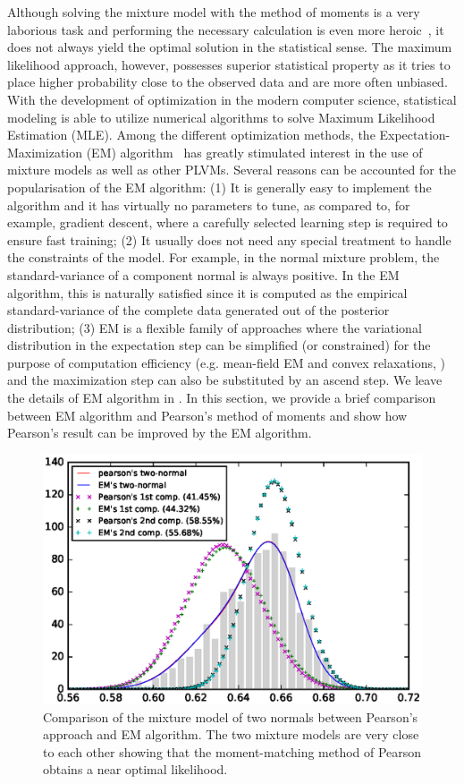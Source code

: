 Although solving the mixture model with the method of moments is a very
laborious task and performing the necessary calculation is even more
heroic~\cite{mclachlan2004finite}, it does not always yield the optimal solution
in the statistical sense. The maximum likelihood approach, however, possesses
superior statistical property as it tries to place higher probability close to
the observed data and are more often unbiased. With the development of
optimization in the modern computer science, statistical modeling is able to
utilize numerical algorithms to solve Maximum Likelihood Estimation (MLE).
Among the different optimization methods, the Expectation-Maximization (EM)
algorithm~\cite{dempster1977maximum} has greatly stimulated interest in the use
of mixture models as well as other PLVMs. Several reasons can be accounted for
the popularisation of the EM algorithm: (1) It is generally easy to implement
the algorithm and it has virtually no parameters to tune, as compared to, for
example, gradient descent, where a carefully selected learning step is required
to ensure fast training; (2) It usually does not need any special treatment to
handle the constraints of the model. For example, in the normal mixture problem,
the standard-variance of a component normal is always positive. In the EM
algorithm, this is naturally satisfied since it is computed as the empirical
standard-variance of the complete data generated out of the posterior
distribution; (3) EM is a flexible family of approaches where the variational
distribution in the expectation step can be simplified (or constrained) for the
purpose of computation efficiency (e.g. mean-field EM and convex relaxations,
\cite[see][Chapter 5, 7]{wainwright2008graphical}) and the maximization step can
also be substituted by an ascend step. We leave the details of EM algorithm in
. In this section, we provide a brief comparison between EM
algorithm and Pearson's method of moments and show how Pearson's result can be
improved by the EM algorithm.

\begin{figure}[ht!]
  \centering
  \includegraphics[width=0.8\linewidth]{figures/pearson-crab-em.eps}
  \caption{Comparison of the mixture model of two normals between Pearson's
  approach and EM algorithm. The two mixture models are very close to each
  other showing that the moment-matching method of Pearson obtains a near
  optimal likelihood.}
  \label{fig::pearson-crab-em}
\end{figure}


